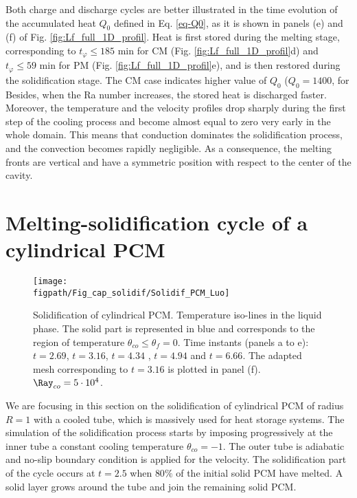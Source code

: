 Both charge and  discharge cycles are better illustrated in the time evolution of the accumulated heat $Q_0$ defined in Eq. \ref{eq-Q0}, as it is shown in panels (e) and (f) of Fig.  \ref{fig:Lf_full_1D_profil}.
Heat is first stored during the melting stage, corresponding to $t_{\varphi} \leq 185$ min for CM (Fig. \ref{fig:Lf_full_1D_profil}d) and $t_{\varphi} \leq 59$ min for PM (Fig. \ref{fig:Lf_full_1D_profil}e), and is then restored during the solidification stage.
The CM case indicates higher value of $Q_0$ ($Q_0 = 1400$, for  
Besides, when the Ra number increases, the stored heat is discharged faster.
Moreover, the temperature and the velocity profiles drop sharply during the first step of the cooling process and become almost equal to zero very early in the whole domain.
This means that conduction dominates the solidification process, and the convection becomes rapidly negligible.
As a consequence, the melting fronts are vertical and have a symmetric position with respect to the center of the cavity. \\


\section{Melting-solidification cycle of a cylindrical PCM} \label{sec-cycle-cylindric}
\begin{figure}
\begin{center}
\begin{minipage}[t]{0.9\textwidth}
	\texttt{[image: \\figpath/Fig\_cap\_solidif/Solidif\_PCM\_Luo]}
\end{minipage}
\end{center}
\caption{Solidification of cylindrical PCM. Temperature iso-lines in the liquid phase. The solid part is represented in blue and corresponds to the region of temperature $\theta_{co} \leq \theta_f=0$. Time instants (panels  a to e): $t= 2.69$, $t = 3.16$, $t = 4.34$ , $t = 4.94$ and $t = 6.66$. The adapted mesh corresponding to $t = 3.16$ is plotted in panel (f).  $ \Ray_{co}=5 \cdot 10^4$.}\label{fig:cycle-cylindric-evol}
\end{figure}

We are focusing in this section on the solidification of cylindrical PCM of radius $R=1$ with a cooled tube, which is massively used for heat storage systems.
The simulation of the solidification process starts by imposing progressively at the inner tube a constant cooling temperature $\theta_{co} = -1$.
The outer tube is adiabatic and no-slip boundary condition is applied for the velocity.
The solidification part of the cycle occurs at $t = 2.5$ when $80 \%$ of the initial solid PCM have melted.
A solid layer grows around the tube and join the remaining solid PCM.

